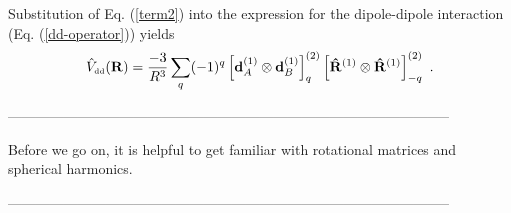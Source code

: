 Substitution of Eq. (\ref{term2}) into the expression for the dipole-dipole interaction (Eq. (\ref{dd-operator})) yields
\begin{equation}
\hat{V}_{\mbox{\tiny dd}}(\mathbf{R}) = \frac{-3}{R^{3}} \sum_{q} (-1)^{q} \left[ \mathbf{d}_{A}^{(1)} \otimes \mathbf{d}_{B}^{(1)} \right]^{(2)}_{q} \left[ \mathbf{\hat{R}}^{(1)} \otimes \mathbf{\hat{R}}^{(1)} \right]^{(2)}_{-q} \ .
\end{equation}

-----------------------------------------------------------------------------------------------

Before we go on, it is helpful to get familiar with rotational matrices and spherical harmonics.


-----------------------------------------------------------------------------------------------



